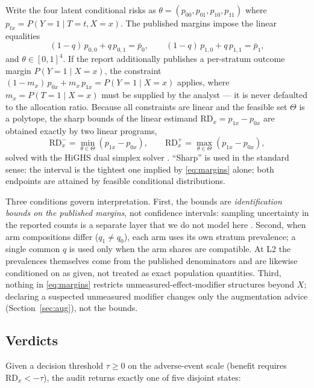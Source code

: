 \documentclass[article]{ajs}
\begin{document}
Write the four latent conditional risks as
$\theta = (p_{00}, p_{01}, p_{10}, p_{11})$ where $p_{tx} = P(Y{=}1 \mid
T{=}t, X{=}x)$. The published margins impose the linear equalities
\begin{equation}
(1-q)\, p_{0,0} + q\, p_{0,1} = \bar p_0, \qquad
(1-q)\, p_{1,0} + q\, p_{1,1} = \bar p_1,
\label{eq:margins}
\end{equation}
and $\theta \in [0,1]^4$. If the report additionally publishes a
per-stratum outcome margin $P(Y{=}1 \mid X{=}x)$, the constraint
$(1 - m_x)\, p_{0x} + m_x\, p_{1x} = P(Y{=}1 \mid X{=}x)$ applies, where
$m_x = P(T{=}1 \mid X{=}x)$ must be supplied by the analyst --- it is
never defaulted to the allocation ratio. Because all constraints are
linear and the feasible set $\Theta$ is a polytope, the sharp bounds of
the linear estimand $\mathrm{RD}_x = p_{1x} - p_{0x}$ are obtained
exactly by two linear programs,
\[
\mathrm{RD}_x^{-} = \min_{\theta \in \Theta} (p_{1x} - p_{0x}), \qquad
\mathrm{RD}_x^{+} = \max_{\theta \in \Theta} (p_{1x} - p_{0x}),
\]
solved with the HiGHS dual simplex solver
\citep{huangfu2018, scipy2020}. ``Sharp'' is used in the standard
sense: the interval is the tightest one implied by \eqref{eq:margins}
alone; both endpoints are attained by feasible conditional
distributions.

Three conditions govern interpretation. First, the bounds are
\emph{identification bounds on the published margins}, not confidence
intervals: sampling uncertainty in the reported counts is a separate
layer that we do not model here \citep[cf.][]{imbens2004}. Second, when
arm compositions differ ($q_1 \neq q_0$), each arm uses its own stratum
prevalence; a single common $q$ is used only when the arm shares are
compatible. At L2 the prevalences themselves come from the published
denominators and are likewise conditioned on as given, not treated as
exact population quantities. Third, nothing in \eqref{eq:margins} restricts
unmeasured-effect-modifier structures beyond $X$; declaring a suspected
unmeasured modifier changes only the augmentation advice
(Section~\ref{sec:aug}), not the bounds.

\subsection{Verdicts}

Given a decision threshold $\tau \ge 0$ on the adverse-event scale
(benefit requires $\mathrm{RD}_x < -\tau$), the audit returns exactly one
of five disjoint states:
\end{document}
